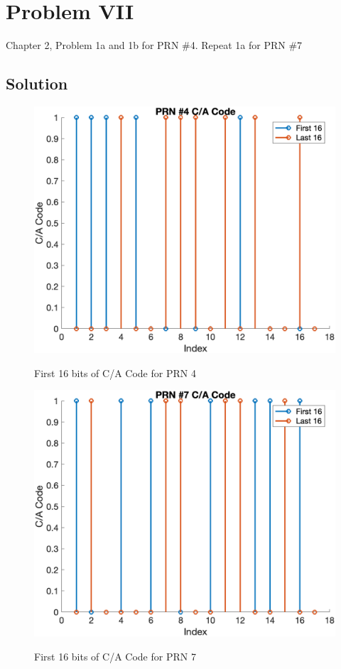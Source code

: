 \documentclass{article}
\begin{document}
\section*{Problem VII}
Chapter 2, Problem 1a and 1b for PRN \#4. Repeat 1a for PRN \#7

\subsection*{Solution}
\begin{figure}[H]
    \centering
    \includegraphics[width=0.75\linewidth]{../figures/p7_prn4_16.png}\label{fig:p7_prn4_16}
    \caption{First 16 bits of C/A Code for PRN 4}
\end{figure}
\begin{figure}[H]
    \centering
    \includegraphics[width=0.75\linewidth]{../figures/p7_prn7_16.png}\label{fig:p7_prn7_16}
    \caption{First 16 bits of C/A Code for PRN 7}
\end{figure}
\end{document}
